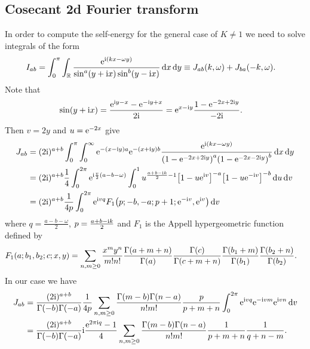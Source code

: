 \documentclass[english, parskip=full]{scrartcl}
\begin{document}
\subsection{Cosecant 2d Fourier transform}
In order to compute the self-energy for the general case of $K\neq 1$ we need to solve integrals of the form
\begin{align}
I_{ab} &= \int_{0}^{\pi} \int_{\mathbb{R}}  \frac{\text{e}^{\text{i} (kx - \omega y)}}{\sin^a(y + \text{i} x) \sin^b(y - \text{i} x)} \, \mathrm{d}x  \,\mathrm{d}y \equiv J_{ab}(k,\omega) + J_{ba}(-k,\omega).
\end{align}
Note that
\begin{align}
\sin(y+\text{i} x) &= \frac{\text{e}^{\text{i} y - x} - \text{e}^{-\text{i} y + x}}{2\text{i}} = \text{e}^{x - \text{i} y} \frac{1 - \text{e}^{ - 2x + 2\text{i} y}}{-2\text{i}}.
\end{align}
Then $v= 2y$ and $u = \text{e}^{-2x}$ give
\begin{align}
J_{ab} &= (2\i)^{a+b} \intx{0}{\pi}{\intx{0}{\infty}{ \powe{-(x-\i y)a} \powe{-(x+\i y)b} \frac{\powe{\i (kx - \omega y)}}{ \kla*{1 - \powe{-2x+2\i y}}^a \kla*{1 - \powe{-2x-2\i y}}^b}}{x} }{y}\\
&= (2\i)^{a+b} \frac{1}{4} \intx{0}{2\pi}{ \powe{\i \frac{v}{2} (a -b - \omega)} \intx{0}{1}{u^{\frac{a+b - \i k}{2} - 1} \klb*{1 - u \powe{\i v}}^{-a} \klb*{1 - u \powe{-\i v}}^{-b} }{u} }{v}\\
&= (2\i)^{a+b} \frac{1}{4p} \intx{0}{2\pi}{\powe{\i vq } F_1\kla*{p; -b,-a;p+1; \powe{-\i v}, \powe{\i v}}}{v}
\end{align}
where $q = \frac{a-b-\omega}{2}$, $p = \frac{a+b-\text{i} k}{2}$ and $F_1$ is the Appell hypergeometric function defined by
\begin{align}
F_1\kla*{a;b_1,b_2;c;x,y} &= \sum_{n,m\ge 0} \frac{x^m y^n}{m!n!} \frac{\Gamma(a+m+n)}{\Gamma(a)} \frac{\Gamma(c)}{\Gamma(c+m+n)} \frac{\Gamma(b_1 + m)}{\Gamma(b_1)} \frac{\Gamma(b_2 + n)}{\Gamma(b_2)}.
\end{align}
In our case we have
\begin{align}
J_{ab} &= \frac{(2\text{i})^{a+b}}{\Gamma(-b)\Gamma(-a)} \frac{1}{4p} \sum_{n,m\ge 0} \frac{\Gamma(m-b)\Gamma(n-a)}{n!m!} \frac{p}{p+m+n} \int_{0}^{2\pi} \text{e}^{\text{i} vq} \text{e}^{-\text{i} vm} \text{e}^{\text{i} vn}  \,\mathrm{d}v\\
&= \frac{(2\text{i})^{a+b}}{\Gamma(-b)\Gamma(-a)} \text{i} \frac{\text{e}^{2\pi\text{i} q} - 1}{4} \sum_{n,m\ge 0} \frac{\Gamma(m-b)\Gamma(n-a)}{n!m!} \frac{1}{p+m+n} \frac{1}{q+n-m}.
\end{align}
\end{document}
